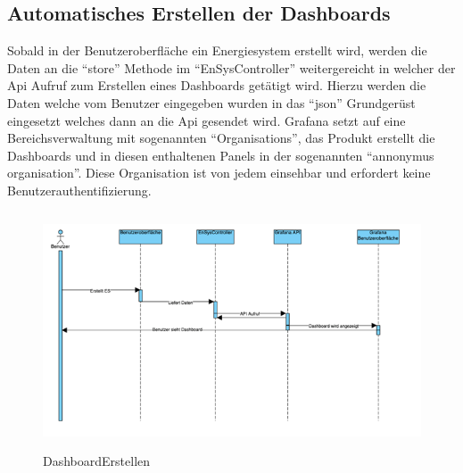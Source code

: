 \subsection{Automatisches Erstellen der Dashboards}
Sobald in der Benutzeroberfläche ein Energiesystem erstellt wird, werden die Daten an die “store” Methode im “EnSysController” weitergereicht in welcher der Api Aufruf zum Erstellen eines Dashboards getätigt wird. Hierzu werden die Daten welche vom Benutzer eingegeben wurden in das “json” Grundgerüst eingesetzt welches dann an die Api gesendet wird. Grafana setzt auf eine Bereichsverwaltung mit sogenannten “Organisations”, das Produkt erstellt die Dashboards und in diesen enthaltenen Panels in der sogenannten “annonymus organisation”. Diese Organisation ist von jedem einsehbar und erfordert keine Benutzerauthentifizierung. 
\begin{figure}[h]
	\centering
	\includegraphics[height=7cm,width=14cm]{images/DashboardErstellen}
	\caption{DashboardErstellen}
	\label{fig:DashboardErstellen }
\end{figure}


